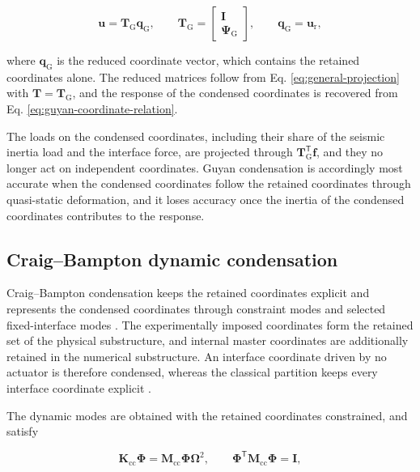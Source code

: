 \documentclass[a4paper,fleqn,review,12pt]{cas-sc}
\numberwithin{equation}{section}
\newcommand{\rev}[1]{\textcolor{red}{#1}}
\begin{document}
\vspace{-3.5em}
\begin{equation}
	\bm{u}=\mathbf{T}_{\mathrm{G}}\bm{q}_{\mathrm{G}},
	\qquad
	\mathbf{T}_{\mathrm{G}}=
	\begin{bmatrix}
		\mathbf{I}\\
		\bm{\Psi}_{\mathrm{G}}
	\end{bmatrix},
	\qquad
	\bm{q}_{\mathrm{G}}=\bm{u}_{\mathrm{r}},
	\label{eq:guyan-transformation}
\end{equation}
\vspace{-3.5em}

\noindent where \(\bm{q}_{\mathrm{G}}\) is the reduced coordinate vector, which contains the retained coordinates alone. The reduced matrices follow from Eq. \eqref{eq:general-projection} with \(\mathbf{T}=\mathbf{T}_{\mathrm{G}}\), and the response of the condensed coordinates is recovered from Eq. \eqref{eq:guyan-coordinate-relation}.

The loads on the condensed coordinates, including their share of the seismic inertia load and the interface force, are projected through \(\mathbf{T}_{\mathrm{G}}^{\mathsf{T}}\bm{f}\), and they no longer act on independent coordinates. Guyan condensation is accordingly most accurate when the condensed coordinates follow the retained coordinates through quasi-static deformation, and it loses accuracy once the inertia of the condensed coordinates contributes to the response.

\subsection{Craig--Bampton dynamic condensation}
\label{sec:cb-condensation}

Craig--Bampton condensation keeps the retained coordinates explicit and represents the condensed coordinates through constraint modes and selected fixed-interface modes \rev{\cite{Craig1968}}. The experimentally imposed coordinates form the retained set of the physical substructure, and internal master coordinates are additionally retained in the numerical substructure. An interface coordinate driven by no actuator is therefore condensed, whereas the classical partition keeps every interface coordinate explicit \cite{Krattiger2019}.

The dynamic modes are obtained with the retained coordinates constrained, and satisfy

\vspace{-3.5em}
\begin{equation}
	\mathbf{K}_{\mathrm{cc}}\bm{\Phi}
	=\mathbf{M}_{\mathrm{cc}}\bm{\Phi}\bm{\Omega}^{2},
	\qquad
	\bm{\Phi}^{\mathsf{T}}\mathbf{M}_{\mathrm{cc}}\bm{\Phi}=\mathbf{I},
	\label{eq:fixed-interface-modes}
\end{equation}
\vspace{-3.5em}
\end{document}
